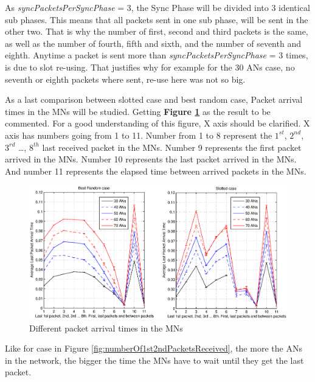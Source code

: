 As \textit{syncPacketsPerSyncPhase} = 3, the Sync Phase will be divided into 3 identical sub phases. This means that all packets sent in one sub 
phase, will be sent in the other two. That is why the number of first, second and third packets is the same, as well as the number of fourth, fifth 
and sixth, and the number of seventh and eighth. Anytime a packet is sent more than \textit{syncPacketsPerSyncPhase} = 3 times, is due to slot re-using. 
That justifies why for example for the 30 \acp{AN} case, no seventh or eighth packets where sent, re-use here was not so big.

As a last comparison between slotted case and best random case, Packet arrival times in the \acp{MN} will be studied. Getting \textbf{Figure
\ref{fig:Lastarrivalpackettimes}} as the result to be commented. For a good understanding of this figure, X axis should be clarified. X axis has numbers
going from 1 to 11. Number from 1 to 8 represent the $1^{st}$, $2^{nd}$, $3^{rd}$ \ldots, $8^{th}$ last received packet in the \acp{MN}. Number 9 
represents the first packet arrived in the \acp{MN}. Number 10 represents the last packet arrived in the \acp{MN}. And number 11 represents the elapsed 
time between arrived packets in the \acp{MN}.

\begin{figure}[ht]
 \begin{center}
  \includegraphics[width=1\textwidth]{Lastarrivalpackettimes.eps}
 \end{center}
 \caption{Different packet arrival times in the \acp{MN}}
 \label{fig:Lastarrivalpackettimes}
\end{figure}

Like for case in Figure \ref{fig:numberOf1st2ndPacketsReceived}, the more the \acp{AN} in the network, the bigger the time the \acp{MN} have to wait 
until they get the last packet.

